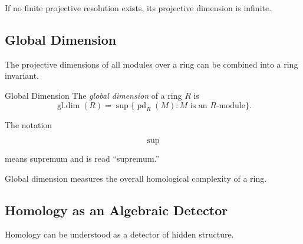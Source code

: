 If no finite projective resolution exists, its projective dimension is
infinite.

\subsection{Global Dimension}
\label{subsec:global-dimension}

The projective dimensions of all modules over a ring can be combined into a
ring invariant.

\begin{definitionbox}{Global Dimension}
The \emph{global dimension} of a ring \(R\) is
\[ \operatorname{gl.dim}(R)
=\sup\{\operatorname{pd}_R(M):M\text{ is an }R\text{-module}\}. \]
\end{definitionbox}

The notation

\[ \sup \]

means supremum and is read ``supremum.''

Global dimension measures the overall homological complexity of a ring.

\subsection{Homology as an Algebraic Detector}
\label{subsec:homology-detector}

Homology can be understood as a detector of hidden structure.

\begin{center}
\end{center}

